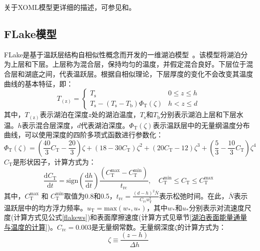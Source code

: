 关于XOML模型更详细的描述，可参见\citet{ling2015multilevel}和\citet{noh2002simulation, noh2011prediction}。

\subsection{FLake模型}\label{FLake模型}
\label{FLake Model}

FLake是基于温跃层结构自相似性概念而开发的一维湖泊模型~\citep{mironovCOSMOTechnicalReport2008a}。该模型将湖泊分为上层和下层。上层称为混合层，保持均匀的温度，并假定混合良好。下层位于混合层和湖底之间，代表温跃层。根据自相似理论，下层厚度的变化不会改变其温度曲线的基本特征，即：
\begin{equation}\label{flaketmp}
    T_{\mathrm{(z)}}=\left\{\begin{array}{ll} T_{\mathrm{s}} & 0 \leqslant z \leqslant h  \\ T_{\mathrm{s}} - \left(T_{\mathrm{s}}-T_{\mathrm{b}} \right) \Phi_{\mathrm{T}} \left(\zeta \right) & h < z \leqslant d \end{array}\right.
\end{equation}
其中，$T_{\mathrm{(z)}}$表示湖泊在深度$z$处的湖泊温度，$T_{\mathrm{s}}$和$T_{\mathrm{b}}$分别表示湖泊上层和下层水温。$h$表示混合层深度，$d$代表湖泊深度。$\Phi_{\mathrm{T}} \left(\zeta \right)$表示温跃层中的无量纲温度分布曲线，可以使用深度的四阶多项式函数进行参数化：
\begin{equation}
    \Phi_{\mathrm{T}} \left(\zeta \right) = \left( \frac{40}{3} C_{\mathrm{T}} - \frac{20}{3} \right) \zeta + (18 - 30 C_{\mathrm{T}}) \zeta^2 + (20 C_{\mathrm{T}} - 12) \zeta^3 + \left( \frac{5}{3} - \frac{10}{3} C_{\mathrm{T}} \right) \zeta^4
\end{equation}
$C_{\mathrm{T}}$是形状因子，计算方式为：
\begin{equation}
    \frac{\mathrm{d} C_{\mathrm{T}}}{\mathrm{d} t} = \mathrm{sign} \left( \frac{\mathrm{d} h}{\mathrm{d} t} \right) \frac{ \left( C_{\mathrm{T}}^{\mathrm{max}} - C_{\mathrm{T}}^{\mathrm{min}} \right) }{t_{\mathrm{rc}}}, \quad C_{\mathrm{T}}^{\min} \leq C_{\mathrm{T}} \leq C_{\mathrm{T}}^{\mathrm{max}}
\end{equation}
其中，$C_{\mathrm{T}}^{\text{max}}$ 和 $C_{\mathrm{T}}^{\text{min}}$取值为0.8和0.5，$t_{\mathrm{rc}} = \frac{\left( d - h \right) ^ {\mathrm{2}} \overline{N}}{C_{\mathrm{rc}} u_{\mathrm{T}} ^ {\mathrm{2}}}$表示松弛时间。在此，$\overline{N}$表示温跃层中的均方浮力频率。$u_{\mathrm{T}}=\mathrm{max}\left(w_*, u_* \right)$，其中$w_*$和$u_*$分别表示对流速度尺度(计算方式见公式\eqref{flakews})和表面摩擦速度(计算方式见章节\ref{湖泊表面能量通量与温度的计算})。$C_{\mathrm{rc}} = 0.003$是无量纲常数。无量纲深度$\zeta$的计算方式为：
\begin{equation}
    \zeta \equiv \frac{\left( z - h \right)}{\Delta h}
\end{equation}

